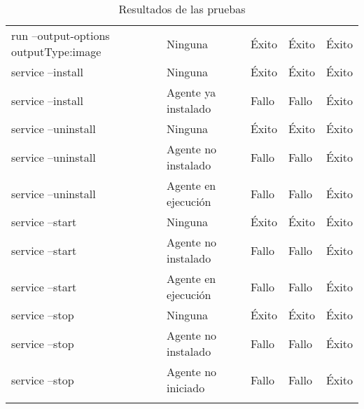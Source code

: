 \begin{table}[h!]
{\begin{tabular}{lllll}
                         run --output-options outputType:image      &   Ninguna                                 &   Éxito                   &   Éxito                   &   Éxito                     \\
                         service --install                          &   Ninguna                                 &   Éxito                   &   Éxito                   &   Éxito                     \\
                         service --install                          &   Agente ya instalado                     &   Fallo                   &   Fallo                   &   Éxito                     \\
                         service --uninstall                        &   Ninguna                                 &   Éxito                   &   Éxito                   &   Éxito                     \\
                         service --uninstall                        &   Agente no instalado                     &   Fallo                   &   Fallo                   &   Éxito                     \\
                         service --uninstall                        &   Agente en ejecución                     &   Fallo                   &   Fallo                   &   Éxito                     \\
                         service --start                            &   Ninguna                                 &   Éxito                   &   Éxito                   &   Éxito                     \\
                         service --start                            &   Agente no instalado                     &   Fallo                   &   Fallo                   &   Éxito                     \\
                         service --start                            &   Agente en ejecución                     &   Fallo                   &   Fallo                   &   Éxito                     \\
                         service --stop                             &   Ninguna                                 &   Éxito                   &   Éxito                   &   Éxito                     \\
                         service --stop                             &   Agente no instalado                     &   Fallo                   &   Fallo                   &   Éxito                     \\
                         service --stop                             &   Agente no iniciado                      &   Fallo                   &   Fallo                   &   Éxito                     \\
                        \hline&
                    \end{tabular}
                }
            \caption{Resultados de las pruebas}
            \label{tab:test-results}
        \end{table}